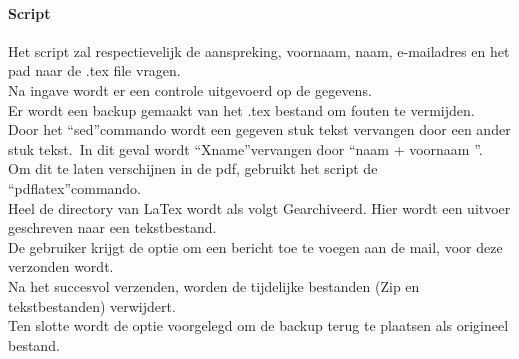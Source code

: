 \documentclass[12pt]{article}
\begin{document}
				\paragraph{Script}				
				Het script zal respectievelijk de aanspreking, voornaam, naam, e-mailadres en het pad naar de .tex file vragen.\\
				Na ingave wordt er een controle uitgevoerd op de gegevens.\\
				Er wordt een backup gemaakt van het .tex bestand om fouten te vermijden.\\
				Door het \textquotedblleft sed\textquotedblright commando wordt een gegeven stuk tekst vervangen door een ander stuk tekst.\
				In dit geval wordt \textquotedblleft Xname\textquotedblright vervangen door \textquotedblleft naam + voornaam \textquotedblright .\\
				Om dit te laten verschijnen in de pdf, gebruikt het script de \textquotedblleft pdflatex\textquotedblright commando. \\
				Heel de directory van LaTex wordt als volgt Gearchiveerd. Hier wordt een uitvoer geschreven naar een tekstbestand.\\
				De gebruiker krijgt de optie om een bericht toe te voegen aan de mail, voor deze verzonden wordt.\\
				Na het succesvol verzenden, worden de tijdelijke bestanden (Zip en tekstbestanden) verwijdert.\\
				Ten slotte wordt de optie voorgelegd om de backup terug te plaatsen als origineel bestand.\\
\end{document}
